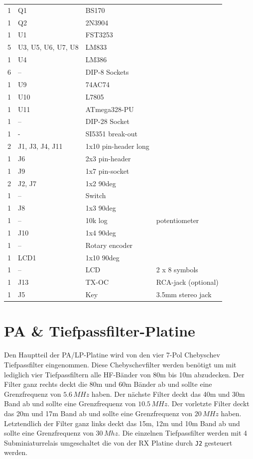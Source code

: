 \documentclass[10pt, a4paper,twoside]{scrartcl}
\begin{document}
\begin{longtable}{|l|p{6cm}|l|l|}
1 & Q1 & BS170 & \\
1 & Q2 & 2N3904 & \\
1 & U1 & FST3253 & \\
5 & U3, U5, U6, U7, U8 & LM833 & \\
1 & U4 & LM386 & \\ 
6 & -- & DIP-8 Sockets & \\
1 & U9 & 74AC74 & \\
1 & U10 & L7805 & \\
1 & U11 & ATmega328-PU & \\
1 & --  & DIP-28 Socket & \\
1 & - & SI5351 break-out & \\
2 & J1, J3, J4, J11 & 1x10 pin-header long & \\
1 & J6 & 2x3 pin-header & \\
1 & J9 & 1x7 pin-socket & \\
2 & J2, J7 & 1x2 90deg & \\
1 & -- & Switch & \\
1 & J8 & 1x3 90deg & \\
1 & -- & 10k log & potentiometer \\
1 & J10 & 1x4 90deg & \\
1 & -- & Rotary encoder & \\
1 & LCD1 & 1x10 90deg & \\
1 & -- & LCD & 2 x 8 symbols \\
1 & J13 & TX-OC & RCA-jack (optional) \\
1 & J5 & Key & 3.5mm stereo jack\\ \hline
\end{longtable}


\cleardoublepage
\section{PA \& Tiefpassfilter-Platine} \label{sec:pa}
Den Hauptteil der PA/LP-Platine wird von den vier 7-Pol Chebyschev Tiefpassfilter eingenommen. Diese Chebyschevfilter werden benötigt um mit lediglich vier Tiefpassfiltern alle HF-Bänder von 80m bis 10m abzudecken. Der Filter ganz rechts deckt die 80m und 60m Bänder ab und sollte eine Grenzfrequenz von $5.6\,MHz$ haben. Der nächste Filter deckt das 40m und 30m Band ab und sollte eine Grenzfrequenz von $10.5\,MHz$. Der vorletzte Filter deckt das 20m und 17m Band ab und sollte eine Grenzfrequenz von $20\,MHz$ haben. Letztendlich der Filter ganz links deckt das 15m, 12m und 10m Band ab und sollte eine Grenzfrequenz von $30\,Mhz$. Die einzelnen Tiefpassfilter werden mit 4 Subminiaturrelais umgeschaltet die von der RX Platine durch \texttt{J2} gesteuert werden.
\end{document}
